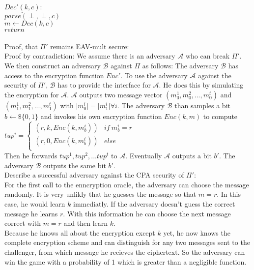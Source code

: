 \noindent \(\underline{Dec'(k, c)}:\)\\
\(parse(\perp, \perp, c)\)\\
\(m \leftarrow  Dec(k,c)\)\\
\(return\)\\
\\
Proof, that \(\Pi'\) remains EAV-mult secure:\\
Proof by contradiction: We assume there is an adversary \(\mathcal{A}\) who can break \(\Pi'\). We then construct an adversary \(\mathcal{B}\) against \(\Pi\) as follows: The adversary \(\mathcal{B}\) has access to the encryption function \(Enc'\). To use the adversary \(\mathcal{A}\) against the security of \(\Pi'\), \(\mathcal{B}\) has to provide the interface for \(\mathcal{A}\). He does this by simulating the encryption for \(\mathcal{A}\). \(\mathcal{A}\) outputs two message vector  \((m_0^1, m_0^2,..., m_0^t)\) and \((m_1^1, m_1^2,..., m_1^t)\) with \(\vert m_0^i \vert = \vert m_1^i \vert \forall i\). The adversary \(\mathcal{B}\) than samples a bit \(b \leftarrow\$ \{0,1\}\) and invokes his own encryption function \(Enc(k,m)\) to compute \(tup^i = \left\{
\begin{array}{ll}
	(r,k, Enc(k,m_b^i)) & if\ m_b^i = r\\
	(r, 0, Enc(k,m_b^i)) & else\\
\end{array}
\right.	\)\\
Then he forwards \(tup^1, tup^2, ... tup^t\) to \(\mathcal{A}\). Eventually \(\mathcal{A}\) outputs a bit \(b'\). The adversary \(\mathcal{B}\) outputs the same bit \(b'\).
\\
Describe a successful adversary against the CPA security of \(\Pi'\):\\
For the first call to the enncryption oracle, the adversary can choose the message randomly. It is very unlikly that he guesses the message so that \(m = r\). In this case, he would learn \(k\) immediatly. If the adversary doesn't guess the correct message he learns \(r\). With this information he can choose the next message correct with \(m = r\) and then learn \(k\). \\
Because he knows all about the encryption except \(k\) yet, he now knows the complete encryption scheme and can distinguish for any two messages sent to the challenger, from which message he recieves the ciphertext. So the adversary can win the game with a probability of 1 which is greater than a negligible function.